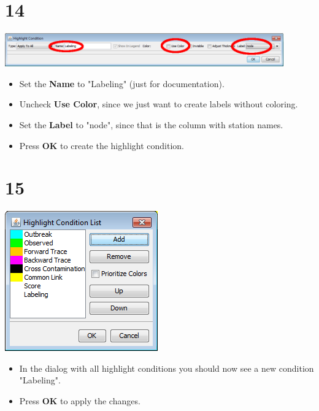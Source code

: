 \documentclass{beamer}
\begin{document}
\section{14}
\begin{frame}
	\begin{center}
  		\includegraphics[width=0.9\textwidth]{14.png}
	\end{center}
	\begin{itemize}
		\item Set the \textbf{Name} to "Labeling" (just for documentation).
		\item Uncheck \textbf{Use Color}, since we just want to create labels without coloring.
		\item Set the \textbf{Label} to "node", since that is the column with station names.
		\item Press \textbf{OK} to create the highlight condition.
	\end{itemize}
\end{frame}

\section{15}
\begin{frame}
	\begin{center}
  		\includegraphics[height=0.6\textheight]{15.png}
	\end{center}
	\begin{itemize}
		\item In the dialog with all highlight conditions you should now see a new condition "Labeling".
		\item Press \textbf{OK} to apply the changes.
	\end{itemize}
\end{frame}
\end{document}
